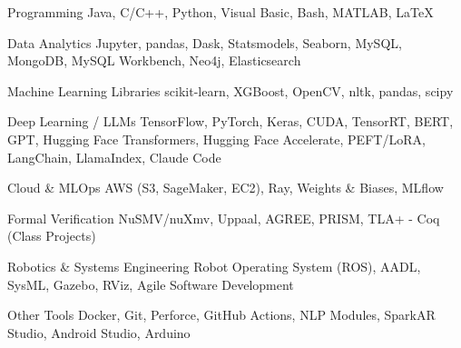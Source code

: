 


\begin{cvskills}


\cvskill
{Programming} %
{Java, C/C++, Python, Visual Basic, Bash, MATLAB, LaTeX} %


\cvskill
{Data Analytics}
{Jupyter, pandas, Dask, Statsmodels, Seaborn, MySQL, MongoDB, MySQL Workbench, Neo4j, Elasticsearch}


\cvskill
{Machine Learning Libraries}
{scikit-learn, XGBoost, OpenCV, nltk, pandas, scipy}

\cvskill
{Deep Learning / LLMs}
{TensorFlow, PyTorch, Keras, CUDA, TensorRT, BERT, GPT, Hugging Face Transformers, Hugging Face Accelerate, PEFT/LoRA, LangChain, LlamaIndex, Claude Code}

\cvskill
{Cloud \& MLOps}
{AWS (S3, SageMaker, EC2), Ray, Weights \& Biases, MLflow}

\cvskill
{Formal Verification}
{NuSMV/nuXmv, Uppaal, AGREE, PRISM, TLA+ - Coq (Class Projects)}

\cvskill
{Robotics \& Systems Engineering}
{Robot Operating System (ROS), AADL, SysML, Gazebo, RViz, Agile Software Development}

\cvskill
{Other Tools}
{Docker, Git, Perforce, GitHub Actions, NLP Modules, SparkAR Studio, Android Studio, Arduino}


\end{cvskills}

